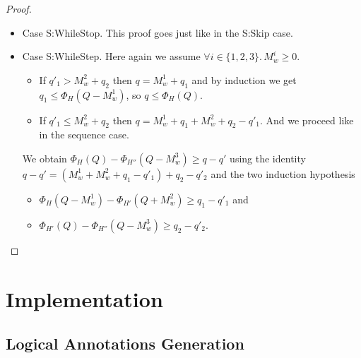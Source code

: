 \documentclass[nocopyrightspace,preprint]{sigplanconf}
\begin{document}
\begin{proof}
\begin{itemize}
\item Case {\sc S:WhileStop}.
  This proof goes just like in the {\sc S:Skip} case.

\item Case {\sc S:WhileStep}.
  Here again we assume $\forall i \in \{1, 2, 3\}.\, M_w^i \ge 0$.
  \begin{itemize}[topsep=0pt]
  \item
    If $q'_1 > M_w^2 + q_2$ then $q = M_w^1 + q_1$ and by induction
    we get $q_1 \le \Phi_H(Q - M_w^1)$, so $q \le \Phi_H(Q)$.
  \item
    If $q'_1 \le M_w^2 + q_2$ then $q = M_w^1 + q_1 + M_w^2 + q_2 - q'_1$.
    And we proceed like in the sequence case.
  \end{itemize}
  We obtain $\Phi_H(Q) - \Phi_{H''}(Q - M_w^3) \ge q - q'$ using the identity
  $q - q' = (M_w^1 + M_w^2 + q_1 - q'_1) + q_2 - q'_2$ and the two
  induction hypothesis
  \begin{itemize}[topsep=0pt]
  \item $\Phi_H(Q - M_w^1) - \Phi_{H'}(Q + M_w^2) \ge q_1 - q'_1$ and
  \item $\Phi_{H'}(Q) - \Phi_{H''}(Q - M_w^3) \ge q_2 - q'_2.$
  \end{itemize}

\end{itemize}
\end{proof}

\section{Implementation}

\subsection{Logical Annotations Generation}
\end{document}
